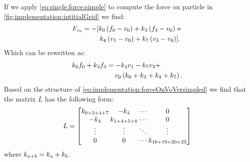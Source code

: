	If we apply \cref{eq:single:force:simple} to compute the force on particle  in \cref{fig:implementation:intitialGrid} we find:
	\begin{equation}\label{eq:implementation:forceOnVo}
		\begin{split}
		F_{v_{0}} 	& = - [				k_{0} \left(f_{0} - v_{0}\right) +
													k_{3} \left(f_{3} - v_{0}\right) + \\
								& \quad\quad\;\;	k_{4} \left(v_{1} - v_{0}\right)  +
													k_{7} \left(v_{3} - v_{0}\right) ].
		\end{split}
	\end{equation}	
	Which can be rewritten as:
	\begin{equation}\label{eq:implementation:forceOnVoVersimpled}
		\begin{split}
		k_{0}f_{0} + k_{3}f_{3} 
			&= - k_{4}v_{1} - k_{7}v_{3} + \\
			& \quad\: v_{0} \left( k_{0} + k_{3} + k_{4} + k_{7} \right).
		\end{split}
	\end{equation}
	Based on the structure of \cref{eq:implementation:forceOnVoVersimpled} we find that the matrix $L$ has the following form:
	\begin{equation}\label{eq:implementation:rhs}
	{
		\arraycolsep=1pt
		L = \begin{bmatrix}
			\spring{0 + 3 + 4 + 7}	& -\spring{4}			& \cdots & 0\\
			- \spring{4} 			& \spring{1 + 4+ 5 + 8}	& \cdots & 0\\
			\vdots					& \vdots 				& \ddots & \vdots\\
			0						& 0 					& \cdots & \spring{16 + 19 + 20 + 23}\\
		\end{bmatrix}
	}
	\end{equation}
	where $k_{a + b} = k_{a} + k_{b}$. 

